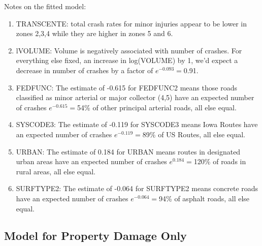 \documentclass[a4paper]{article}\usepackage[]{graphicx}\usepackage[]{color}
\begin{document}
Notes on the fitted model:

\begin{enumerate}
\item
TRANSCENTE: total crash rates for minor injuries appear to be lower in zones 2,3,4 while they are higher in zones 5 and 6. 

\item
lVOLUME: Volume is negatively associated with number of crashes. For everything else fixed, an increase in log(VOLUME) by 1, we'd expect a decrease in number of crashes by a factor of $e^{-0.093}=$0.91.

\item
FEDFUNC: The estimate of -0.615 for FEDFUNC2 means those roads classified as minor arterial or major collector (4,5) have an expected number of crashes $e^{-0.615}=$54\% of other principal arterial roads, all else equal. 

\item
SYSCODE3: The estimate of -0.119 for SYSCODE3 means Iowa Routes have an expected number of crashes $e^{-0.119}=$89\% of US Routes, all else equal.

\item
URBAN: The estimate of 0.184 for URBAN means routes in designated urban areas have an expected number of crashes $e^{0.184}=$120\% of roads in rural areas, all else equal.

\item
SURFTYPE2: The estimate of -0.064 for SURFTYPE2 means concrete roads have an expected number of crashes $e^{-0.064}=$94\% of asphalt roads, all else equal.

\end{enumerate}


\clearpage
\subsection{Model for Property Damage Only}
\end{document}
